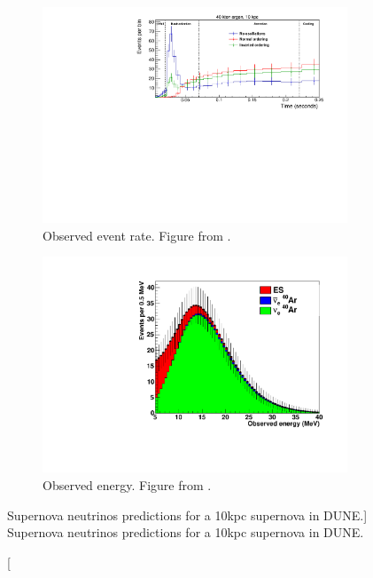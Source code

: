 \begin{figure}
	\centering
	\begin{subfigure}[b]{\textwidth}
		\includegraphics[width=\textwidth]{figures/sn_time.pdf}
		\caption [Observed event rate.]{Observed event rate. Figure from \cite{Abi:2020evt}.}
		\label{fig:sn_time}
	\end{subfigure}
	\begin{subfigure}[b]{\textwidth}
		\centering
		\includegraphics[width=\textwidth]{figures/sn_energy.pdf}
		\caption [Observed energy.]{Observed energy. Figure from \cite{Acciarri:2015uup}.}
		\label{fig:sn_energy}
	\end{subfigure}
	\caption
	[Supernova neutrinos predictions for a 10kpc supernova in DUNE.]
	{Supernova neutrinos predictions for a 10kpc supernova in DUNE.}
	\label{fig:sn_nus}
\end{figure}

